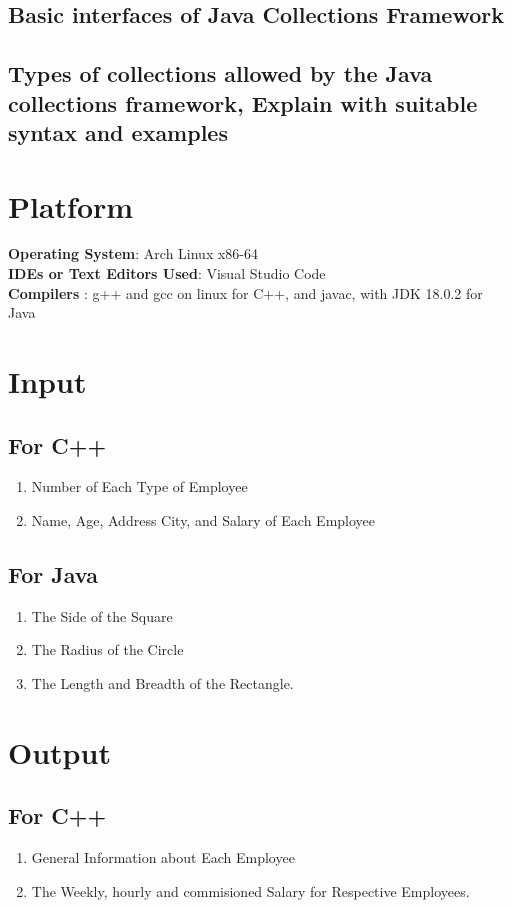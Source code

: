\documentclass[11pt]{article}
\begin{document}
\subsection{Basic interfaces of Java Collections Framework}

\subsection{Types of collections allowed by the Java collections framework, Explain with suitable syntax and examples}

\section{Platform}
\textbf{Operating System}: Arch Linux x86-64 \\
\textbf{IDEs or Text Editors Used}: Visual Studio Code\\
\textbf{Compilers} : g++ and gcc on linux for C++, and javac, with JDK 18.0.2 for Java\\

\section{Input}

\subsection*{For C++}
\begin{enumerate}
	\item Number of Each Type of Employee
	\item Name, Age, Address City, and Salary of Each Employee
\end{enumerate}

\subsection*{For Java}
\begin{enumerate}
	\item The Side of the Square
	\item The Radius of the Circle
	\item The Length and Breadth of the Rectangle.
\end{enumerate}

\section{Output}
\subsection*{For C++}
\begin{enumerate}
	\item General Information about Each Employee
	\item The Weekly, hourly and commisioned Salary for Respective Employees.
\end{enumerate}
\end{document}
